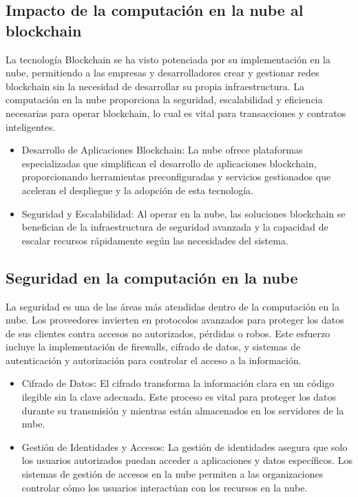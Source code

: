 {        \subsection[Cloud Computing y Blockchain]{Impacto de la computaci{\'o}n en la nube al blockchain}
            La tecnolog{\'i}a Blockchain se ha visto potenciada por su implementaci{\'o}n en la nube, permitiendo a las empresas y desarrolladores crear y gestionar redes blockchain sin la necesidad de desarrollar su propia infraestructura. La computaci{\'o}n en la nube proporciona la seguridad, escalabilidad y eficiencia necesarias para operar blockchain, lo cual es vital para transacciones y contratos inteligentes.

            \begin{itemize}
                \item Desarrollo de Aplicaciones Blockchain: La nube ofrece plataformas especializadas que simplifican el desarrollo de aplicaciones blockchain, proporcionando herramientas preconfiguradas y servicios gestionados que aceleran el despliegue y la adopci{\'o}n de esta tecnolog{\'i}a.
                \item Seguridad y Escalabilidad: Al operar en la nube, las soluciones blockchain se benefician de la infraestructura de seguridad avanzada y la capacidad de escalar recursos r{\'a}pidamente seg{\'u}n las necesidades del sistema.
            \end{itemize}
        \subsection{Seguridad en la computaci{\'o}n en la nube}
            La seguridad es una de las {\'a}reas m{\'a}s atendidas dentro de la computaci{\'o}n en la nube. Los proveedores invierten en protocolos avanzados para proteger los datos de sus clientes contra accesos no autorizados, p{\'e}rdidas o robos. Este esfuerzo incluye la implementaci{\'o}n de firewalls, cifrado de datos, y sistemas de autenticaci{\'o}n y autorizaci{\'o}n para controlar el acceso a la informaci{\'o}n.

            \begin{itemize}
                \item Cifrado de Datos: El cifrado transforma la informaci{\'o}n clara en un c{\'o}digo ilegible sin la clave adecuada. Este proceso es vital para proteger los datos durante su transmisi{\'o}n y mientras est{\'a}n almacenados en los servidores de la nube.
                \item Gesti{\'o}n de Identidades y Accesos: La gesti{\'o}n de identidades asegura que solo los usuarios autorizados puedan acceder a aplicaciones y datos espec{\'i}ficos. Los sistemas de gesti{\'o}n de accesos en la nube permiten a las organizaciones controlar c{\'o}mo los usuarios interact{\'u}an con los recursos en la nube.
            \end{itemize}
}
